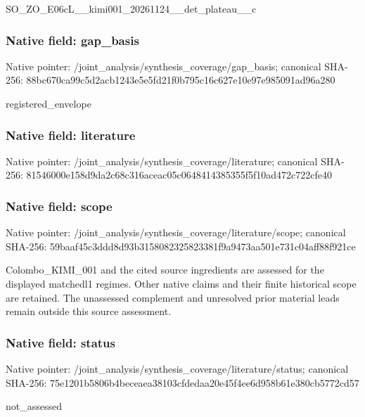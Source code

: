 \documentclass[10pt,a4paper]{article}
\begin{document}
SO\_ZO\_E06cL\_\_kimi001\_202\allowbreak{}61124\_\_det\_plateau\_\_c


\subsubsection{Native field: gap\_basis}


Native pointer: /joint\_analysis/synthesi\allowbreak{}s\_coverage/gap\_basis; canonical SHA-256: 88bc670ca99c5d2acb1243e5\allowbreak{}e5fd21f0b795c16c627e10e9\allowbreak{}7e985091ad96a280


registered\_envelope


\subsubsection{Native field: literature}


Native pointer: /joint\_analysis/synthesi\allowbreak{}s\_coverage/literature; canonical SHA-256: 81546000e158d9da2c68c316\allowbreak{}aceac05c0648414385355f5f\allowbreak{}10ad472c722cfe40



\subsubsection{Native field: scope}


Native pointer: /joint\_analysis/synthesi\allowbreak{}s\_coverage/literature/sc\allowbreak{}ope; canonical SHA-256: 59baaf45c3ddd8d93b315808\allowbreak{}2325823381f9a9473aa501e7\allowbreak{}31c04aff88f921ce


Colombo\_KIMI\_001 and the cited source ingredients are assessed for the displayed matchedl1 regimes. Other native claims and their finite historical scope are retained. The unassessed complement and unresolved prior material leads remain outside this source assessment.


\subsubsection{Native field: status}


Native pointer: /joint\_analysis/synthesi\allowbreak{}s\_coverage/literature/st\allowbreak{}atus; canonical SHA-256: 75e1201b5806b4beceaea381\allowbreak{}03cfdedaa20e45f4ee6d958b\allowbreak{}61e380cb5772cd57


not\_assessed
\end{document}
